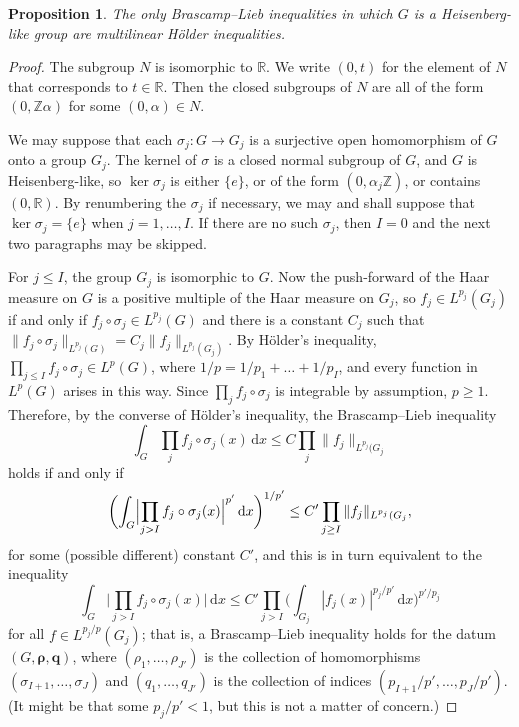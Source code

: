 \documentclass[12pt,twoside,a4paper]{amsart}
\newtheorem{prop}[thm]{Proposition}%
\theoremstyle{definition}
\theoremstyle{remark}
\numberwithin{equation}{section}
\newcommand{\R}{\mathbb{R}}
\newcommand{\Z}{\mathbb{Z}}
\newcommand{\wrt}[1]{\,\mathrm{d} #1}
\newcommand{\bsrho}{\boldsymbol{\rho}}
\newcommand{\bsq}{\boldsymbol{q}}
\newcommand{\bigglpar}{\biggl(}
\newcommand{\biggrpar}{\biggr)}
\newcommand{\labs}{\left\vert}
\newcommand{\rabs}{\right\vert}
\newcommand{\Biglabs}{\Bigl\vert}
\newcommand{\Bigrabs}{\Bigr\vert}
\newcommand{\bigglabs}{\biggl\vert}
\newcommand{\biggrabs}{\biggr\vert}
\begin{document}
\begin{prop}
The only Brascamp--Lieb inequalities in which $G$ is a Heisenberg-like group are multilinear Hölder inequalities.
\end{prop}

\begin{proof}
The subgroup $N$ is isomorphic to  $\R$.
We write $(0, t)$ for the element of $N$ that corresponds to $t \in \R$.
Then the closed subgroups of $N$ are all of the form $(0, \Z \alpha)$ for some $(0, \alpha) \in N$.

We may suppose that each $\sigma_j\colon  G \to G_j$ is a surjective open homomorphism of $G$ onto a group $G_j$.
The kernel of $\sigma$ is a closed normal subgroup of $G$, and $G$ is Heisenberg-like, so $\ker\sigma_j$ is either $\{e\}$, or of the form $(0, \alpha_j \Z)$, or contains $(0,\R)$.
By renumbering the $\sigma_j$ if necessary, we may and shall suppose that $\ker\sigma_j = \{e\}$ when $j = 1, \dots, I$.
If there are no such $\sigma_j$, then $I = 0$ and the next two paragraphs may be skipped.

For $j \leq I$, the group  $G_j$ is isomorphic to $G$.
Now the push-forward of the Haar measure on $G$ is a positive multiple of the  Haar measure on $G_j$, so $f_j \in L^{p_j}(G_j)$ if and only if $f_j \circ \sigma_j \in L^{p_j}(G)$ and there is a constant $C_j$ such that $\| f_j \circ \sigma_j\|_{L^{p_j}(G)} = C_j \| f_j \|_{L^{p_j}(G_j)}$.
By Hölder's inequality, $\prod_{j \leq I} f_j \circ \sigma_j \in L^p(G)$, where $1/p = 1/p_1 + \dots + 1/p_I$, and every function in $L^p(G)$ arises in this way.
Since $\prod_j f_j \circ \sigma_j$ is integrable by assumption, $p \geq 1$.
Therefore, by the converse of Hölder's inequality, the Brascamp--Lieb inequality 
\[
\int_{G} \prod_j f_j \circ \sigma_j(x) \wrt x \leq C \prod_{j} \| f_j \|_{L^{p_j}(G_j} 
\]
holds if and only if 
\[
\bigglpar\int_{G} \Biglabs \prod_{j > I} f_j \circ \sigma_j(x) \Bigrabs^{p'} \wrt x \biggrpar^{1/p'} 
\leq C' \prod_{j\geq I} \| f_j \|_{L^{p_j}(G_j} ,
\]
for some (possible different) constant $C'$, and this is in turn equivalent to the inequality
\[
\int_{G} \bigglabs \prod_{j > I} f_j \circ \sigma_j(x) \biggrabs \wrt x
\leq C' \prod_{j > I} \bigglpar \int_{G_j} \labs f_j(x) \rabs^{p_j /p'} \wrt x \biggrpar^{p'/p_j}
\]
for all $f \in L^{p_j/p}(G_j)$; that is,  a Brascamp--Lieb inequality holds for the datum $(G, \bsrho, \bsq)$, where $(\rho_1, \dots, \rho_{J'})$ is the collection of homomorphisms $(\sigma_{I+1}, \dots, \sigma_{J})$ and $(q_1, \dots, q_{J'})$ is the collection of indices $(p_{I+1}/p', \dots, p_{J}/p')$.
(It might be that some $p_j/p' < 1$, but this is not a matter of concern.)


\end{proof}
\end{document}
